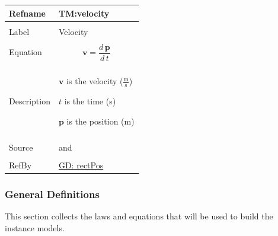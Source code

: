 \documentclass[12pt]{article}
\begin{document}
\noindent \begin{minipage}{\textwidth}
\begin{tabular}{p{} p{}}
\toprule \textbf{Refname} & \textbf{TM:velocity}
\label{TM:velocity}
\\ \midrule \\
Label & Velocity
\\ \midrule \\
Equation & \begin{displaymath}
           \mathbf{v}=\frac{d\,\mathbf{p}}{d\,t}
           \end{displaymath}
\\ \midrule \\
Description & \begin{symbDescription}
              \item{$\mathbf{v}$ is the velocity ($\frac{\text{m}}{\text{s}}$)}
              \item{$t$ is the time (s)}
              \item{$\mathbf{p}$ is the position (m)}
              \end{symbDescription}
\\ \midrule \\
Source & \cite{velocityWiki} and \cite[(pg. 6)]{hibbeler2004}
\\ \midrule \\
RefBy & \hyperref[GD:rectPos]{GD: rectPos}
\\ \bottomrule \end{tabular}
\end{minipage}
\subsubsection{General Definitions}
\label{Sec:GDs}
This section collects the laws and equations that will be used to build the instance models.
\par~
\end{document}
